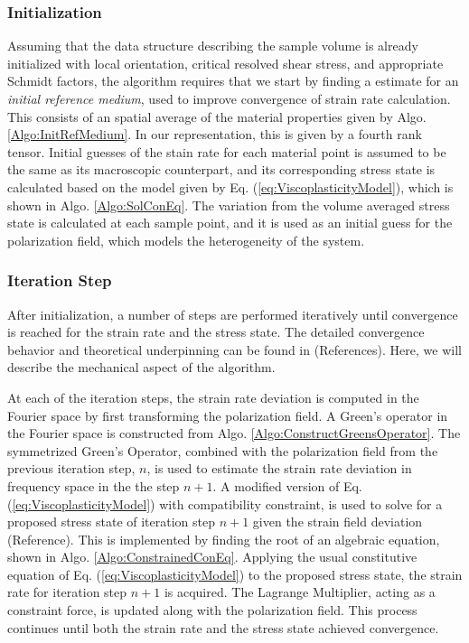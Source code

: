 \documentclass[11pt]{article}
\newcommand{\RefEq}[1] {Eq. (\ref{#1})}
\newcommand{\RefAlgo}[1]{Algo. \ref{#1}}
\begin{document}
\subsubsection{Initialization}

Assuming that the data structure describing the sample volume is already initialized with local orientation, critical resolved shear stress, and appropriate Schmidt factors, the algorithm requires that we start by finding a estimate for an \textit{initial reference medium}, used to improve convergence of strain rate calculation.  This consists of an spatial average of the material properties given by \RefAlgo{Algo:InitRefMedium}.  In our representation, this is given by a fourth rank tensor.  Initial guesses of the stain rate for each material point is assumed to be the same as its macroscopic counterpart, and its corresponding stress state is calculated based on the model given by \RefEq{eq:ViscoplasticityModel}, which is shown in \RefAlgo{Algo:SolConEq}.  The variation from the volume averaged stress state is calculated at each sample point, and it is used as an initial guess for the polarization field, which models the heterogeneity of the system.

\subsubsection{Iteration Step}

After initialization, a number of steps are performed iteratively until convergence is reached for the strain rate and the stress state.  The detailed convergence behavior and theoretical underpinning can be found in (References).  Here, we will describe the mechanical aspect of the algorithm.

At each of the iteration steps, the strain rate deviation is computed in the Fourier space by first transforming the polarization field.  A Green's operator in the Fourier space is constructed from \RefAlgo{Algo:ConstructGreensOperator}.  The symmetrized Green's Operator, combined with the polarization field from the previous iteration step, $n$, is used to estimate the strain rate deviation in frequency space in the the step $n+1$.  A modified version of \RefEq{eq:ViscoplasticityModel} with compatibility constraint, is used to solve for a proposed stress state of iteration step $n+1$ given the strain field deviation (Reference).  This is implemented by finding the root of an algebraic equation, shown in \RefAlgo{Algo:ConstrainedConEq}.  Applying the usual constitutive equation of \RefEq{eq:ViscoplasticityModel} to the proposed stress state, the strain rate for iteration step $n+1$ is acquired.  The Lagrange Multiplier, acting as a constraint force, is updated along with the polarization field.  This process continues until both the strain rate and the stress state achieved convergence.
\end{document}
